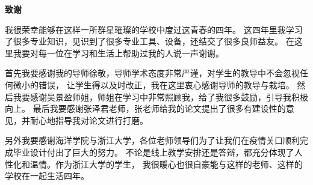 \clearpage
\begin{center}
    \bfseries {} 致谢
\end{center}

我很荣幸能够在这样一所群星璀璨的学校中度过这青春的四年。
这四年里我学习了很多专业知识，见识到了很多专业工具、设备，还结交了很多良师益友。
在这里我要对每一位在学习和生活上帮助过我的人说一声谢谢。

首先我要感谢我的导师徐敬，导师学术态度非常严谨，对学生的教导中不会忽视任何微小的错误，
让学生得以及时改正，我在这里衷心感谢导师的教导与栽培。
然后我要感谢吴景盈师姐，师姐在学习中非常照顾我，给了我很多鼓励，引导我积极向上。
最后我要感谢张泽君老师，张老师给我的论文提出了很多有建设性的意见，并耐心地指导我对论文进行打磨。

另外我要感谢海洋学院与浙江大学，各位老师领导们为了让我们在疫情关口顺利完成毕业设计付出了巨大的努力。
不论是线上教学安排还是答辩，都充分体现了人性化和温情。作为浙江大学的学生，
我很暖心也很自豪能与这样的老师、这样的学校在一起生活四年。

